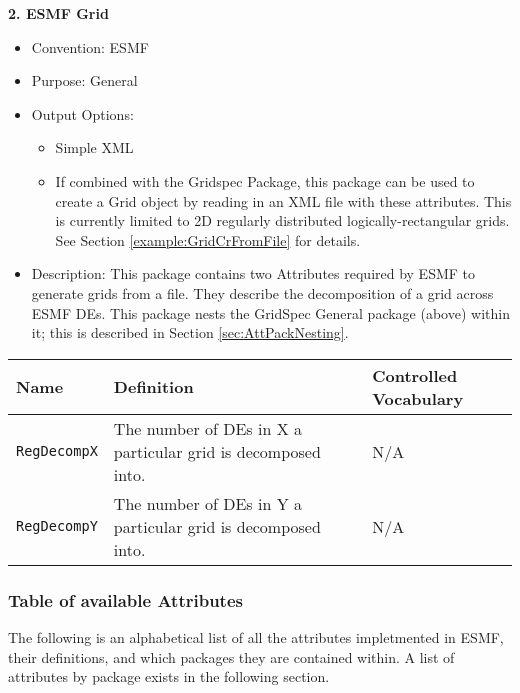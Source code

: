 \vspace{.20in}
{\bf 2. ESMF Grid}

\label{ESMFGridAttributePackage}

\begin{itemize}
    \item Convention: ESMF
    \item Purpose: General
    \item Output Options:
    \begin{itemize}
        \item Simple XML
        \item If combined with the Gridspec Package, this package can be used to create a Grid object by reading in an XML file with these attributes. This is currently limited to 2D regularly distributed logically-rectangular grids. See Section \ref{example:GridCrFromFile} for details. 
    \end{itemize}
    \item Description: This package contains two Attributes required by ESMF to generate grids from a file. They describe the decomposition of a grid across ESMF DEs.  This package nests the GridSpec General package (above) within it; this is described in Section \ref{sec:AttPackNesting}.
\end{itemize}


\begin{tabular}{|p{5cm}|p{7cm}|p{5cm}|}
{\bf Name} & {\bf Definition} & {\bf Controlled Vocabulary} \\
\hline\hline
{\tt RegDecompX} & The number of DEs in X a particular grid is decomposed into.& N/A\\
{\tt RegDecompY} & The number of DEs in Y a particular grid is decomposed into.& N/A\\
\end{tabular}



\vspace{.20in}
\subsubsection{Table of available Attributes}

The following is an alphabetical list of all the attributes impletmented in ESMF, their definitions, and which packages they are contained within. A list of attributes by package exists in the following section. 


